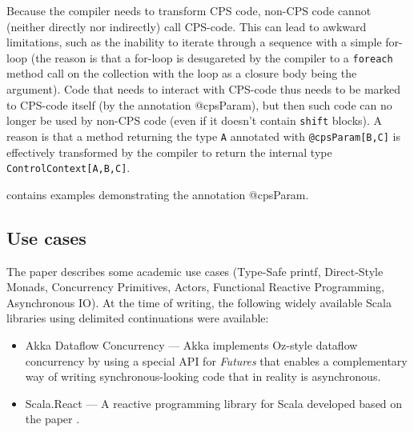 Because the compiler needs to transform CPS code, non-CPS code cannot (neither directly nor indirectly) call CPS-code. This can lead to awkward limitations, such as the inability to iterate through a sequence with a simple for-loop (the reason is that a for-loop is desugareted by the compiler to a \texttt{foreach} method call on the collection with the loop as a closure body being the argument). Code that needs to interact with CPS-code thus needs to be marked to CPS-code itself (by the annotation @cpsParam), but then such code can no longer be used by non-CPS code (even if it doesn't contain \texttt{shift} blocks). A reason is that a method returning the type \texttt{A} annotated with \texttt{@cpsParam[B,C]} is effectively transformed by the compiler to return the internal type \texttt{ControlContext[A,B,C]}. 

 contains examples demonstrating the annotation @cpsParam.

\subsection{Use cases}

The paper \cite{CPSTransform} describes some academic use cases (Type-Safe printf, Direct-Style Monads, Concurrency Primitives, Actors, Functional Reactive Programming, Asynchronous IO). At the time of writing, the following widely available Scala libraries using delimited continuations were available:
\begin{itemize}
\item Akka Dataflow Concurrency --- Akka implements Oz-style dataflow concurrency by using a special API for \emph{Futures} that enables a complementary way of writing synchronous-looking code that in reality is asynchronous. \cite{AkkaDataflow}
\item Scala.React --- A reactive programming library for Scala developed based on the paper \cite{DeprecatingObservers}.

\end{itemize}


